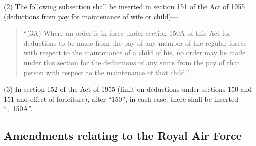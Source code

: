 \documentclass[a4paper]{article}
\begin{document}
(2) The following subsection shall be inserted in section 151 of the Act of 1955 (deductions from pay for maintenance of wife or child)—
\begin{quotation}
“(3A) Where an order is in force under section 150A of this Act for deductions to be made from the pay of any member of the regular forces with respect to the maintenance of a child of his, no order may be made under this section for the deductions of any sums from the pay of that person with respect to the maintenance of that child.”.
\end{quotation}

(3) In section 152 of the Act of 1955 (limit on deductions under sections 150 and 151 and effect of forfeiture), after “150”, in each case, there shall be inserted “,~150A”.

\subsection[3. Amendments relating to the Royal Air Force]{Amendments relating to the Royal Air Force}
\end{document}
